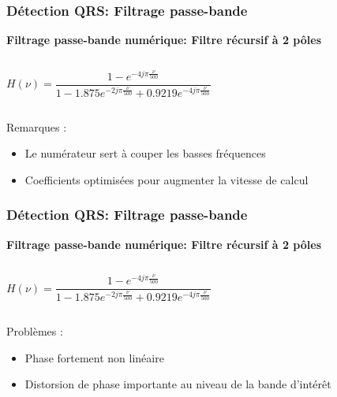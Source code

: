 \documentclass{beamer}
\begin{document}
\begin{frame}
\frametitle{Détection QRS: Filtrage passe-bande}
 \textbf{Filtrage passe-bande numérique: Filtre récursif à  2 pôles}\\
\begin{columns}
\column{60mm}
\[H(\nu) = \frac{1 - e^{-4 j \pi \frac{\nu}{500}}}{1 - 1.875 e^{-2 j \pi \frac{\nu}{500}} + 0.9219  e^{-4 j \pi \frac{\nu}{500}}} \]
\column{60mm} 
\begin{center}
\end{center}
\end{columns}
\vspace{0.3cm}
Remarques :
\begin{itemize}
\item Le numérateur sert à couper les basses fréquences
\item Coefficients optimisées pour augmenter la vitesse de calcul
\end{itemize}
\end{frame}

\begin{frame}
\frametitle{Détection QRS: Filtrage passe-bande}
 \textbf{Filtrage passe-bande numérique: Filtre récursif à  2 pôles}\\
\begin{columns}
\column{60mm}
\[H(\nu) = \frac{1 - e^{-4 j \pi \frac{\nu}{500}}}{1 - 1.875 e^{-2 j \pi \frac{\nu}{500}} + 0.9219  e^{-4 j \pi \frac{\nu}{500}}} \]
\column{60mm} 
\begin{center}
\end{center}
\end{columns}
Problèmes :
\begin{itemize}
\item Phase fortement non linéaire
\item Distorsion de phase importante au niveau de la bande d'intérêt
\end{itemize}
\end{frame}
\end{document}
